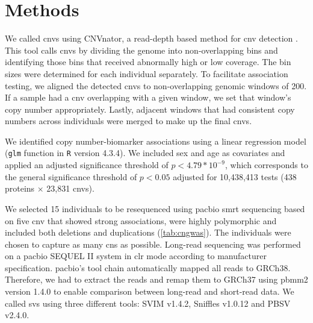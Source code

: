 \documentclass[twoside=false]{scrbook}
\begin{document}
\section{Methods}
We called \glspl{cnv} using \textsf{CNVnator}, a read-depth based method for \gls{cnv} detection \cite{Abyzov2011b}.
This tool calls \glspl{cnv} by dividing the genome into non-overlapping bins and identifying those bins that received abnormally high or low coverage.
The bin sizes were determined for each individual separately.
To facilitate association testing, we aligned the detected \glspl{cnv} to non-overlapping genomic windows of \qty{200}{\base}.
If a sample had a \gls{cnv} overlapping with a given window, we set that window's copy number appropriately.
Lastly, adjacent windows that had consistent copy numbers across individuals were merged to make up the final \glspl{cnv}.

We identified copy number-biomarker associations using a linear regression model (\texttt{glm} function in \texttt{R} version 4.3.4).
We included sex and age as covariates and applied an adjusted significance threshold of \(p < 4.79*10^{-9}\), which corresponds to the general significance threshold of $p < 0.05$ adjusted for 10,438,413 tests (438 proteins $\times$ 23,831 \glspl{cnv}).

We selected 15 individuals to be resequenced using \gls{pacbio} \gls{smrt} sequencing based on five \gls{cnv} that showed strong associations, were highly polymorphic and included both deletions and duplications (\cref{tab:cngwas}).
The individuals were chosen to capture as many \glspl{cn} as possible.
Long-read sequencing was performed on a \gls{pacbio} SEQUEL II system in \gls{clr} mode according to manufacturer specification.
\gls{pacbio}'s tool chain automatically mapped all reads to GRCh38.
Therefore, we had to extract the reads and remap them to GRCh37 using \textsf{pbmm2} version 1.4.0 to enable comparison between long-read and short-read data.
We called \glspl{sv} using three different tools: \textsf{SVIM} v1.4.2, \textsf{Sniffles} v1.0.12 and \textsf{PBSV} v2.4.0.
\end{document}
